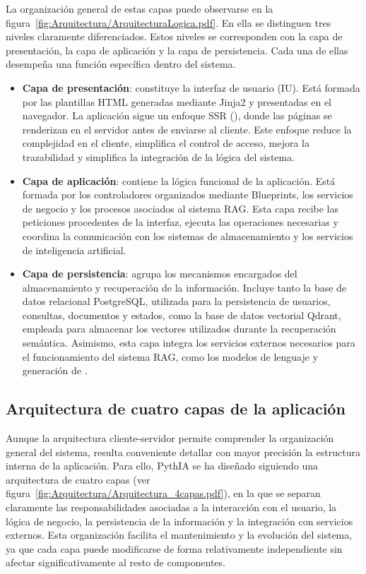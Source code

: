 La organización general de estas capas puede observarse en la figura~\ref{fig:Arquitectura/ArquitecturaLogica.pdf}. En ella se distinguen tres niveles claramente diferenciados. Estos niveles se corresponden con la capa de presentación, la capa de aplicación y la capa de persistencia. Cada una de ellas desempeña una función específica dentro del sistema. 


\begin{itemize}
	\item \textbf{Capa de presentación}: constituye la interfaz de usuario (IU). Está formada por las plantillas HTML generadas mediante Jinja2 y presentadas en el navegador. La aplicación sigue un enfoque SSR (), donde las páginas se renderizan en el servidor antes de enviarse al cliente. Este enfoque reduce la complejidad en el cliente, simplifica el control de acceso, mejora la trazabilidad y simplifica la integración de la lógica del sistema.
	\item \textbf{Capa de aplicación}: contiene la lógica funcional de la aplicación. Está formada por los controladores organizados mediante Blueprints, los servicios de negocio y los procesos asociados al sistema RAG. Esta capa recibe las peticiones procedentes de la interfaz, ejecuta las operaciones necesarias y coordina la comunicación con los sistemas de almacenamiento y los servicios de inteligencia artificial.
	\item \textbf{Capa de persistencia}: agrupa los mecanismos encargados del almacenamiento y recuperación de la información. Incluye tanto la base de datos relacional PostgreSQL, utilizada para la persistencia de usuarios, consultas, documentos y estados, como la base de datos vectorial Qdrant, empleada para almacenar los vectores utilizados durante la recuperación semántica. Asimismo, esta capa integra los servicios externos necesarios para el funcionamiento del sistema RAG, como los modelos de lenguaje y generación de .	
\end{itemize}

\subsection{Arquitectura de cuatro capas de la aplicación}

Aunque la arquitectura cliente-servidor permite comprender la organización general del sistema, resulta conveniente detallar con mayor precisión la estructura interna de la aplicación. Para ello, PythIA se ha diseñado siguiendo una arquitectura de cuatro capas (ver figura~\ref{fig:Arquitectura/Arquitectura_4capas.pdf}), en la que se separan claramente las responsabilidades asociadas a la interacción con el usuario, la lógica de negocio, la persistencia de la información y la integración con servicios externos. Esta organización facilita el mantenimiento y la evolución del sistema, ya que cada capa puede modificarse de forma relativamente independiente sin afectar significativamente al resto de componentes.

